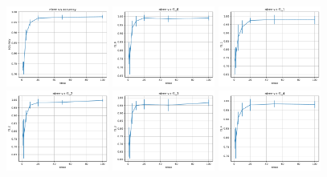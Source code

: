 \begin{figure}
    \centering
    \includegraphics[width=0.30\textwidth]{figures/mnist_random_forest_accuracy.pdf}
    \includegraphics[width=0.30\textwidth]{figures/mnist_random_forest_f1_0.pdf}
    \includegraphics[width=0.30\textwidth]{figures/mnist_random_forest_f1_1.pdf}
    \includegraphics[width=0.30\textwidth]{figures/mnist_random_forest_f1_2.pdf}
    \includegraphics[width=0.30\textwidth]{figures/mnist_random_forest_f1_3.pdf}
    \includegraphics[width=0.30\textwidth]{figures/mnist_random_forest_f1_4.pdf}

\end{figure}
